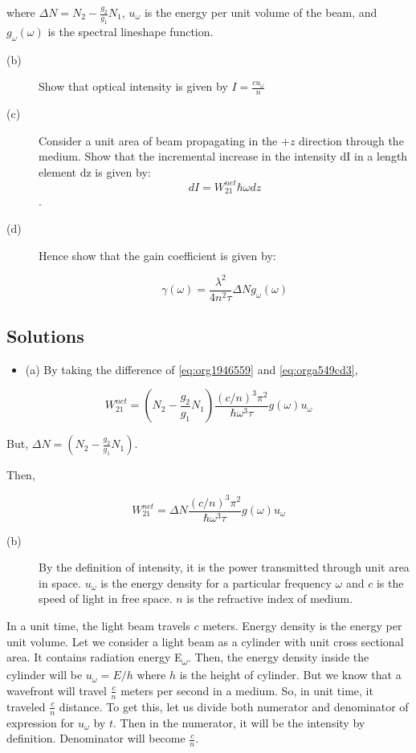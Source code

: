 \documentclass[a4paper,11pt]{article}
\begin{document}
where \(\Delta N = N_2 - \frac{g_2}{g_1} N_1\), \(u_\omega\) is the energy per unit volume of the beam, and \(g_\omega(\omega)\) is the spectral lineshape function.

\begin{description}
\item[{(b)}] Show that optical intensity is given by \(I=\frac{c u_\omega}{n}\)

\item[{(c)}] Consider a unit area of beam propagating in the \(+z\) direction through the medium. Show that the incremental increase in the intensity dI in a length element dz is given by:
$$dI = W_{21}^{net} \hbar\omega dz$$.
\item[{(d)}] Hence show that the gain coefficient is given by:

$$ \gamma(\omega) = \frac{\lambda^2}{4 n^2 \tau} \Delta N g_\omega(\omega) $$
\end{description}

\subsection*{Solutions}
\label{sec:org91bc14d}
\begin{itemize}
\item (a) By taking the difference of \ref{eq:org1946559} and \ref{eq:orga549cd3},
\end{itemize}
$$W_{21}^{net} = \left(N_2-\frac{g_2}{g_1}N_1\right) \frac{(c/n)^3 \pi^2}{\hbar \omega^3\tau} g(\omega) u_\omega $$

But, \(\Delta N = \left(N_2-\frac{g_2}{g_1}N_1\right)\).

Then,

$$W_{21}^{net} = \Delta N \frac{(c/n)^3 \pi^2}{\hbar \omega^3\tau} g(\omega) u_\omega $$

\begin{description}
\item[{(b)}] By the definition of intensity, it is the power transmitted through unit area in space. \(u_\omega\) is the energy density for a particular frequency \(\omega\) and \(c\) is the speed of light in free space. \(n\) is the refractive index of medium.
\end{description}

In a unit time, the light beam travels \(c\) meters. Energy density is the energy per unit volume.  Let we consider a light beam as a cylinder with unit cross sectional area. It contains radiation energy E\textsubscript{\(\omega\)}. Then, the energy density inside the cylinder will be \(u_\omega = E/h\) where \(h\) is the height of cylinder. But we know that a wavefront will travel \(\frac{c}{n}\) meters per second in a medium. So, in unit time, it traveled \(\frac{c}{n}\) distance. To get this, let us divide both numerator and denominator of expression for \(u_\omega\) by \(t\). Then in the numerator, it will be the intensity by definition. Denominator will become \(\frac{c}{n}\). 
\end{document}
